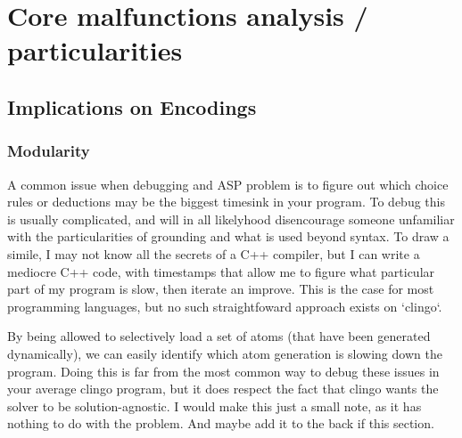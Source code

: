 \documentclass{llncs}
\begin{document}
\section{Core malfunctions analysis / particularities}

\subsection{Implications on Encodings}
\color{green}
\subsubsection{Modularity}
A common issue when debugging and ASP problem is to figure out which choice rules or deductions may be the biggest timesink in your program. To debug this is usually complicated, and will in all likelyhood disencourage someone unfamiliar with the particularities of grounding and what is used beyond syntax. To draw a simile, I may not know all the secrets of a C++ compiler, but I can write a mediocre C++ code, with timestamps that allow me to figure what particular part of my program is slow, then iterate an improve. This is the case for most programming languages, but no such straightfoward approach exists on `clingo`.

By being allowed to selectively load a set of atoms (that have been generated dynamically), we can easily identify which atom generation is slowing down the program. Doing this is far from the most common way to debug these issues in your average clingo program, but it does respect the fact that clingo wants the solver to be solution-agnostic. 
\color{black} \color{gray} I would make this just a small note, as it has nothing to do with the problem. And maybe add it to the back if this section. \color{black}
\end{document}
